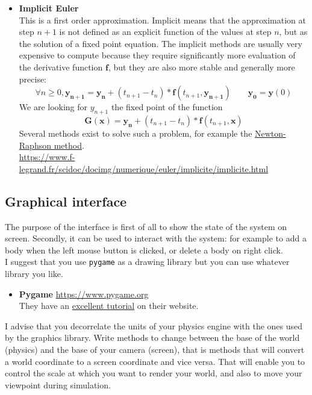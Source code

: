 \documentclass{article}
\newcommand{\myvec}[1]{\ensuremath{\mathbf{#1}}}
\begin{document}
\begin{itemize}
    \item \textbf{Implicit Euler} \\
    This is a first order approximation. Implicit means that the approximation at step $n+1$ is not defined as an explicit function of the values at step $n$, but as the solution of a fixed point equation. The implicit methods are usually very expensive to compute because they require significantly more evaluation of the derivative function $\myvec{f}$, but they are also more stable and generally more precise:
    \begin{equation*}
        \forall n \ge 0, \myvec{y_{n+1}} = \myvec{y_n} + (t_{n+1} - t_n) * \myvec{f}(t_{n+1}, \myvec{y_{n+1}}) \quad\quad \myvec{y_0} = \myvec{y}(0)
    \end{equation*}
    We are looking for $y_{n+1}$ the fixed point of the function
        \[\myvec{G}(\myvec{x}) = \myvec{y_n} + (t_{n+1} - t_n) * \myvec{f}(t_{n+1}, \myvec{x})\]
    Several methods exist to solve such a problem, for example the \href{https://en.wikipedia.org/wiki/Newton\%27s_method}{Newton-Raphson method}. \\
    \url{https://www.f-legrand.fr/scidoc/docimg/numerique/euler/implicite/implicite.html}
\end{itemize}

\subsection{Graphical interface}
\label{interface}

The purpose of the interface is first of all to show the state of the system on screen. Secondly, it can be used to interact with the system: for example to add a body when the left mouse button is clicked, or delete a body on right click.\\
I suggest that you use \verb!pygame! as a drawing library but you can use whatever library you like.

\begin{itemize}
    \item \textbf{Pygame} \url{https://www.pygame.org}\\
    They have an \href{https://www.pygame.org/docs/}{excellent tutorial} on their website.
\end{itemize}

I advise that you decorrelate the units of your physics engine with the ones used by the graphics library. Write methods to change between the base of the world (physics) and the base of your camera (screen), that is methods that will convert a world coordinate to a screen coordinate and vice versa. That will enable you to control the scale at which you want to render your world, and also to move your viewpoint during simulation.
\end{document}
